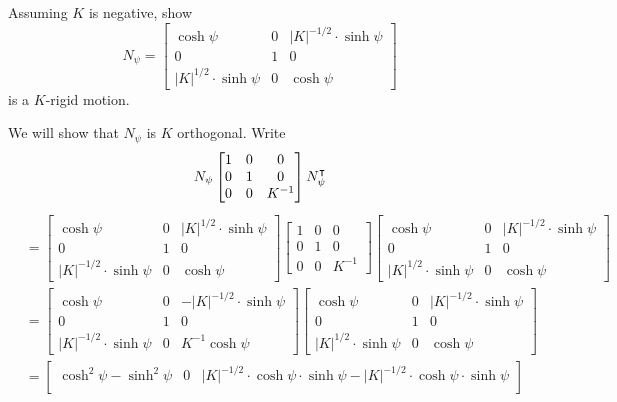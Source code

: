 \documentclass[newpage,hints,,12pt,noauthor,nooutcomes,handout]{ximera}
\begin{document}
\begin{problem}
  Assuming $K$ is negative, show
  \[
   N_\psi=
  \begin{bmatrix}
    \cosh\psi & 0 & |K|^{-1/2}\cdot\sinh\psi\\
    0 & 1 & 0\\
    |K|^{1/2}\cdot\sinh\psi & 0 & \cosh\psi
  \end{bmatrix}
  \]
  is a $K$-rigid motion.
  \begin{freeResponse}
    We will show that $N_\psi$ is $K$ orthogonal. Write
    \[
    N_\psi
      \begin{bmatrix}
        1 & 0 & 0 \\
        0 & 1 & 0 \\
        0 & 0 & K^{-1}
      \end{bmatrix}
      N_\psi^\intercal
    \]
    \begin{align*}
  &=
      \begin{bmatrix}
    \cosh\psi & 0 & |K|^{1/2}\cdot\sinh\psi\\
    0 & 1 & 0\\
    |K|^{-1/2}\cdot\sinh\psi & 0 & \cosh\psi
      \end{bmatrix}
      \begin{bmatrix}
        1 & 0 & 0 \\
        0 & 1 & 0 \\
        0 & 0 & K^{-1}
      \end{bmatrix}
 \begin{bmatrix}
    \cosh\psi & 0 & |K|^{-1/2}\cdot\sinh\psi\\
    0 & 1 & 0\\
    |K|^{1/2}\cdot\sinh\psi & 0 & \cosh\psi
 \end{bmatrix} \\
&=\begin{bmatrix}
    \cosh\psi & 0 & -|K|^{-1/2}\cdot\sinh\psi\\
    0 & 1 & 0\\
    |K|^{-1/2}\cdot\sinh\psi & 0 &  K^{-1}\cosh\psi
      \end{bmatrix}
 \begin{bmatrix}
    \cosh\psi & 0 & |K|^{-1/2}\cdot\sinh\psi\\
    0 & 1 & 0\\
    |K|^{1/2}\cdot\sinh\psi & 0 & \cosh\psi
 \end{bmatrix}\\
&=\begin{bmatrix}
    \cosh^2\psi -\sinh^2\psi & 0 & |K|^{-1/2}\cdot\cosh\psi\cdot\sinh\psi- |K|^{-1/2}\cdot\cosh\psi\cdot\sinh\psi\\

\end{bmatrix}
\end{align*}
\end{freeResponse}
\end{problem}
\end{document}
